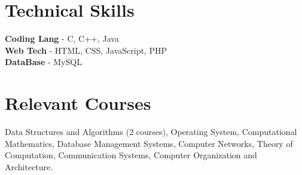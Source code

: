 \documentclass[margin, centered]{res}
\begin{document}
\begin{resume}

\section{Technical \hspace{2mm} Skills}
\textbf{Coding Lang} - C, C++, Java\\
\textbf{Web Tech} - HTML, CSS, JavaScript, PHP\\
\textbf{DataBase} - MySQL

\section{Relevant \hspace{2mm} Courses}
Data Structures and Algorithms (2 courses), Operating System, Computational Mathematics, Database Management Systems, Computer Networks, Theory of Computation, Communication Systems, Computer Organization and Architecture.



\end{resume}
\end{document}
